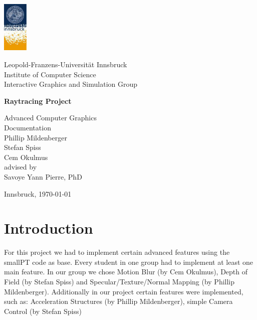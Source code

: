 \documentclass[11pt,a4paper]{article}
\begin{document}

\begin{titlepage} %

\begin{center}
\includegraphics[width=1.2cm]{images/uibk}

\begin{large}
Leopold-Franzens-Universität Innsbruck\\[5mm]
Institute of Computer Science\\
Interactive Graphics and Simulation Group\\[25mm]
\end{large}

{\LARGE \bf Raytracing Project}

Advanced Computer Graphics\\ 
Documentation\\[15mm]

Phillip Mildenberger\\
Stefan Spiss\\
Cem Okulmus\\[35mm]

advised by\\
Savoye Yann Pierre, PhD\\[10mm]

\vfill

Innsbruck, \today
\end{center}

\end{titlepage}



\section{Introduction}
\label{sec:intro}

For this project we had to implement certain advanced features using the smallPT code as base. Every student in one group had to implement at least one main feature. In our group we chose Motion Blur (by Cem Okulmus), Depth of Field (by Stefan Spiss) and Specular/Texture/Normal Mapping (by Phillip Mildenberger). Additionally in our project certain features were implemented, such as: Acceleration Structures (by Phillip Mildenberger), simple Camera Control (by Stefan Spiss)  
\end{document}
